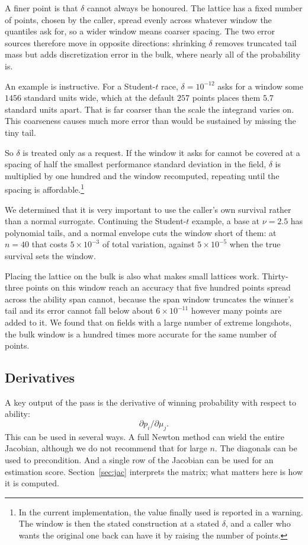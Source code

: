 \documentclass[11pt]{article}
\begin{document}
A finer point is that $\delta$ cannot always be honoured. The
lattice has a fixed number of points, chosen by the caller, spread evenly
across whatever window the quantiles ask for, so a wider window means
coarser spacing. The two error sources therefore move in opposite
directions: shrinking $\delta$ removes truncated tail mass but adds
discretization error in the bulk, where nearly all of the probability is.

An example is instructive. For a Student-$t$ race, $\delta=10^{-12}$ asks for a window some
$1456$ standard units wide, which at the default $257$ points places them
$5.7$ standard units apart. That is far coarser than the scale the
integrand varies on. This coarseness causes much more error than would be sustained by missing the tiny tail.

So $\delta$ is treated only as a request. If the window it asks for cannot be
covered at a spacing of half the smallest performance standard deviation
in the field, $\delta$ is multiplied by one hundred and the window
recomputed, repeating until the spacing is affordable.\footnote{In the
current implementation, the value finally used is reported in a warning.
The window is then the stated construction at a stated $\delta$, and a
caller who wants the original one back can have it by raising the number
of points.}

We determined that it is very important to use the caller's own
survival rather than a normal surrogate. Continuing the Student-$t$
example, a base at $\nu=2.5$ has polynomial tails, and a normal envelope
cuts the window short of them: at $n=40$ that costs
$5\times10^{-3}$ of total variation, against $5\times10^{-5}$ when the
true survival sets the window.

Placing the lattice on the bulk is also what makes small lattices work.
Thirty-three points on this window reach an accuracy that five hundred
points spread across the ability span cannot, because the span window
truncates the winner's tail and its error cannot fall below about
$6\times10^{-11}$ however many points are added to it. We found that on
fields with a large number of extreme longshots, the bulk window is a
hundred times more accurate for the same number of points.



\subsection{Derivatives}

A key output of the pass is the derivative of winning probability with respect to ability:
$$
\partial p_i/\partial\mu_j.
$$
This can be used in several ways. A full Newton method can wield the entire Jacobian, although we do not recommend that for large $n$. The diagonals can be used to precondition. And a single row of the Jacobian can be used for an estimation score. Section~\ref{sec:jac} interprets the matrix; what
matters here is how it is computed.
\end{document}
